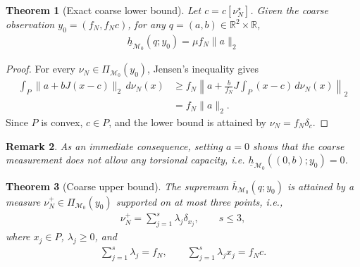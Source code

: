 \documentclass[11pt,a4paper]{article}
\theoremstyle{proposition}
\newtheorem{theorem}{Theorem}[section]
\newtheorem{remark}[theorem]{Remark}
\begin{document}
\begin{theorem}[Exact coarse lower bound]
    Let $c=c[\nu_N^\star]$. Given the coarse observation $y_0=(f_N, f_Nc)$, for any $q=(a,b)\in\mathbb R^2\times\mathbb R$,
    \begin{align}
            \boxed{\underline h_{\mathcal M_0}(q;y_0) = \mu f_N\|a\|_2}
    \end{align}
\end{theorem}
\begin{proof}
    For every $\nu_N\in\Pi_{\mathcal M_0}(y_0)$,
    Jensen's inequality gives
    \begin{align}
        \int_P\|a+bJ(x-c)\|_2\,d\nu_N(x)
        &\geq
        f_N\left\|
        a+\frac{b}{f_N}J
        \int_P(x-c)\,d\nu_N(x)
        \right\|_2\\
        &=f_N\|a\|_2.
    \end{align}
    Since $P$ is convex, $c\in P$, and the lower bound
    is attained by $\nu_N=f_N\delta_c$.
\end{proof}

\begin{remark}
As an immediate consequence, setting $a=0$ shows that the coarse measurement does not allow any torsional capacity, i.e. $\underline h_{\mathcal M_0}((0,b);y_0)=0$.
\end{remark}

\begin{theorem}[Coarse upper bound]
\label{prop:coarse_upper_atomic}
    The supremum $\overline h_{\mathcal M_0}(q;y_0)$ is attained by a measure $\nu_N^+\in\Pi_{\mathcal M_0}(y_0)$ supported on at most three points, i.e.,
    \begin{align}
        \nu_N^+
        =
        \sum_{j=1}^{s}\lambda_j\delta_{x_j},
        \qquad s\leq 3,
    \end{align}
    where $x_j\in P$, $\lambda_j\geq 0$, and
    \begin{align}
        \sum_{j=1}^{s}\lambda_j=f_N,
        \qquad
        \sum_{j=1}^{s}\lambda_jx_j=f_Nc.
    \end{align}
\end{theorem}
\end{document}
